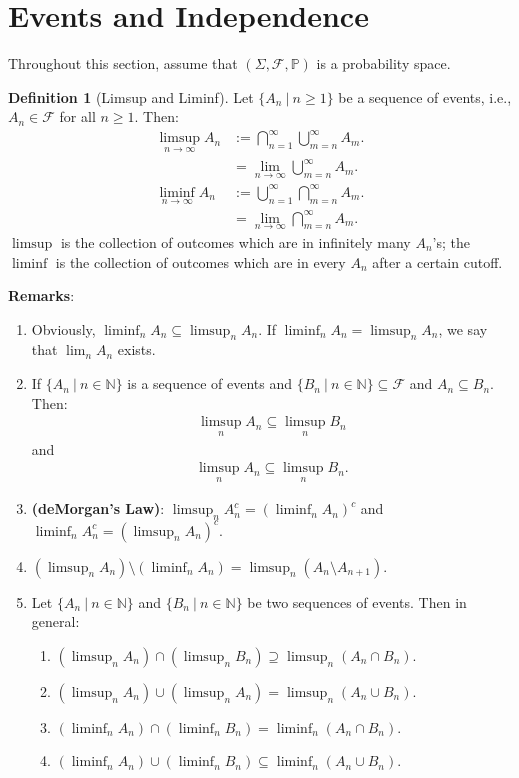 \documentclass[11pt]{article}
\theoremstyle{definition}
\newtheorem{defn}{Definition}[section]
\theoremstyle{theorem}
\newcommand{\N}[0]{\mathbb{N}}
\begin{document}
\section{Events and Independence}
Throughout this section, assume that \( ( \Sigma, \mathcal{F}, \mathbb{P} ) \) is a probability space. 
\begin{defn}[Limsup and Liminf]
	Let \( \{ A_n\ |\ n \geq 1 \} \) be a sequence of events, i.e., \( A_n \in \mathcal{F} \) for all \( n \geq 1 \). Then: 
	\begin{align}
		\limsup_{n \rightarrow \infty} A_n & := \bigcap_{n=1}^\infty \bigcup_{m=n}^\infty A_m. \\ 
		& = \lim_{n \rightarrow \infty} \bigcup_{m=n}^\infty A_m. \\
		\liminf_{n \rightarrow \infty} A_n & := \bigcup_{n=1}^\infty \bigcap_{m=n}^\infty A_m. \\
		& = \lim_{n \rightarrow \infty} \bigcap_{m=n}^\infty A_m.
	\end{align}
	\( \limsup \) is the collection of outcomes which are in infinitely many \( A_n \)'s; the \( \liminf \) is the collection of outcomes which are in every \( A_n \) after a certain cutoff. 
\end{defn}
\textbf{Remarks}:
\begin{enumerate}[noitemsep]
	\item Obviously, \( \liminf_{n } A_n \subseteq \limsup_{n } A_n \). If \( \liminf_{n } A_n = \limsup_{n} A_n \), we say that \( \lim_{n}  A_n \) exists. 
	\item If \( \{ A_n\ |\ n \in \N \} \) is a sequence of events and \( \{ B_n\ |\ n \in \N \} \subseteq \mathcal{F} \) and \( A_n \subseteq B_n \). Then:
	\begin{align*}
		\limsup_{n} A_n \subseteq \limsup_{n} B_n
	\end{align*}
	and 
	\begin{align*}
		\limsup_{n} A_n \subseteq \limsup_{n} B_n. 	
	\end{align*}
	\item \textbf{(deMorgan's Law)}: \( \limsup_{n}A_n^c =(\liminf_{n} A_n)^c \) and \( \liminf_{n}A_n^c = ( \limsup_{n} A_n)^c \).
	\item \( ( \limsup_{n}A_n ) \setminus ( \liminf_{n} A_n ) = \limsup_{n} ( A_n \setminus A_{n+1} ) \).
	\item Let \( \{ A_n\ |\ n \in \N \} \) and \( \{ B_n\ |\ n \in \N \} \) be two sequences of events. Then in general: 
	\begin{enumerate}[noitemsep]
		\item \( ( \limsup_{n} A_n) \cap (\limsup_{n}B_n ) \supseteq \limsup_{n}(A_n \cap B_n) \).
		\item \( (\limsup_{n}A_n ) \cup ( \limsup_{n} A_n ) = \limsup_{n} (A_n \cup B_n ) \).
		\item \( ( \liminf_{n} A_n ) \cap ( \liminf_n B_n ) = \liminf_{n} (A_n \cap B_n) \).
		\item \( (\liminf_{n} A_n ) \cup ( \liminf_{n} B_n ) \subseteq \liminf_{n} (A_n \cup B_n) \).
	\end{enumerate}
\end{enumerate}
\end{document}
